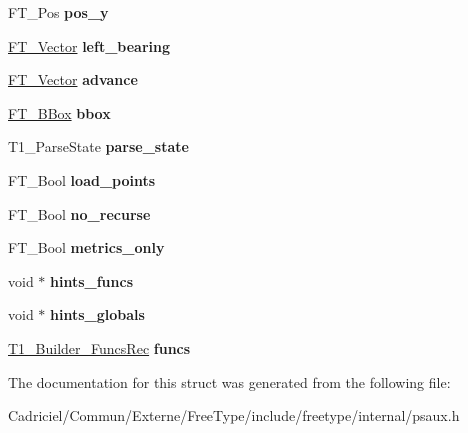 \begin{DoxyCompactItemize}
\item 
\hypertarget{struct_t1___builder_rec___ad389bf0d5182b677ed3dba05a9612530}{F\-T\-\_\-\-Pos {\bfseries pos\-\_\-y}}\label{struct_t1___builder_rec___ad389bf0d5182b677ed3dba05a9612530}

\item 
\hypertarget{struct_t1___builder_rec___a86247b8fd87873ef93aecf0e27e4b6dc}{\hyperlink{struct_f_t___vector__}{F\-T\-\_\-\-Vector} {\bfseries left\-\_\-bearing}}\label{struct_t1___builder_rec___a86247b8fd87873ef93aecf0e27e4b6dc}

\item 
\hypertarget{struct_t1___builder_rec___a48575715ea96f16bdc7077996013ef9e}{\hyperlink{struct_f_t___vector__}{F\-T\-\_\-\-Vector} {\bfseries advance}}\label{struct_t1___builder_rec___a48575715ea96f16bdc7077996013ef9e}

\item 
\hypertarget{struct_t1___builder_rec___a534c6d954f8cf791a94489350314a8f7}{\hyperlink{struct_f_t___b_box__}{F\-T\-\_\-\-B\-Box} {\bfseries bbox}}\label{struct_t1___builder_rec___a534c6d954f8cf791a94489350314a8f7}

\item 
\hypertarget{struct_t1___builder_rec___afaa675cc3601ed05ed86bc474153094b}{T1\-\_\-\-Parse\-State {\bfseries parse\-\_\-state}}\label{struct_t1___builder_rec___afaa675cc3601ed05ed86bc474153094b}

\item 
\hypertarget{struct_t1___builder_rec___acaf59a770471bf90b5b7d9f72e97e64e}{F\-T\-\_\-\-Bool {\bfseries load\-\_\-points}}\label{struct_t1___builder_rec___acaf59a770471bf90b5b7d9f72e97e64e}

\item 
\hypertarget{struct_t1___builder_rec___a0369f22bec404666e1c7dc6bb648ac28}{F\-T\-\_\-\-Bool {\bfseries no\-\_\-recurse}}\label{struct_t1___builder_rec___a0369f22bec404666e1c7dc6bb648ac28}

\item 
\hypertarget{struct_t1___builder_rec___ab4c509b363e5a5f4da25460413e9364f}{F\-T\-\_\-\-Bool {\bfseries metrics\-\_\-only}}\label{struct_t1___builder_rec___ab4c509b363e5a5f4da25460413e9364f}

\item 
\hypertarget{struct_t1___builder_rec___aeed4b5ebe5256cc07e31159b4a4a95ff}{void $\ast$ {\bfseries hints\-\_\-funcs}}\label{struct_t1___builder_rec___aeed4b5ebe5256cc07e31159b4a4a95ff}

\item 
\hypertarget{struct_t1___builder_rec___ae94605dc79c1d54c1b59423046b38671}{void $\ast$ {\bfseries hints\-\_\-globals}}\label{struct_t1___builder_rec___ae94605dc79c1d54c1b59423046b38671}

\item 
\hypertarget{struct_t1___builder_rec___acecf3c6c134bccd36a1d30e10147ca54}{\hyperlink{struct_t1___builder___funcs_rec__}{T1\-\_\-\-Builder\-\_\-\-Funcs\-Rec} {\bfseries funcs}}\label{struct_t1___builder_rec___acecf3c6c134bccd36a1d30e10147ca54}

\end{DoxyCompactItemize}


The documentation for this struct was generated from the following file\-:\begin{DoxyCompactItemize}
\item 
Cadriciel/\-Commun/\-Externe/\-Free\-Type/include/freetype/internal/psaux.\-h\end{DoxyCompactItemize}
